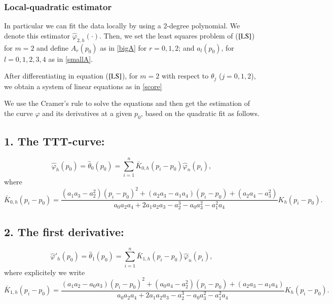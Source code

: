 \documentclass[preprint,12pt]{elsarticle}
\begin{document}
\subsubsection{Local-quadratic estimator}\label{quad}
\noindent In particular we can fit the data locally by using a 2-degree polynomial. We denote this estimator $\widehat{\varphi}_{2,h}(\cdot)$. Then, we set the least squares problem of ($\ref{LS}$) for $m=2$ and define $A_r(p_0)$ as in \eqref{bigA} for $ r=0,1,2$; and  $
a_l(p_0)$, for $ l=0, 1, 2, 3, 4$ as in \eqref{smallA}.

After differentiating in equation ($\ref{LS}$), for $m=2$ with respect to $\theta_j$ ($j=0, 1, 2$), we obtain a system of linear equations as in \eqref{score}


We use the Cramer's rule to solve the equations and then get the estimation of the curve $\varphi$ and its derivatives at a given $p_0$, based on the quadratic fit as follows.
\subsection*{ 1. The TTT-curve:}
\begin{equation}\label{theta0}
\widehat{\varphi}_{h}(p_0)=\widehat{\theta}_0(p_0)= \sum_{i=1}^n \bar{{K}}_{0,h}\left(p_i-p_0\right) \widehat{\varphi}_n(p_i),
\end{equation}
where
\[
\bar{{K}}_{0,h}\left(p_i-p_0\right)=\frac{\left(a_1a_3-a_2^2\right)\left(p_i-p_0\right)^2+\left(a_2a_3-a_1a_4\right)\left(p_i-p_0\right)+\left(a_2a_4-a_3^2\right)}{a_0a_2a_4+2a_1a_2a_3-a_2^3-a_0a_3^2-a_1^2a_4} K_h\left(p_i-p_0\right).
\]

\subsection*{2. The first derivative:}
\begin{equation}\label{theta1}
\widehat{\varphi}'_{h}(p_0)=\widehat{\theta}_1(p_0)= \sum_{i=1}^n \bar{{K}}_{1,h}\left(p_i-p_0\right) \widehat{\varphi}_n(p_i),
\end{equation}
where explicitely we write
\[
\bar{{K}}_{1,h}\left(p_i-p_0\right)=\frac{\left(a_1a_2-a_0a_3\right)\left(p_i-p_0\right)^2+\left(a_0a_4-a_2^2\right)\left(p_i-p_0\right)+\left(a_2a_3-a_1a_4\right)}{a_0a_2a_4+2a_1a_2a_3-a_2^3-a_0a_3^2-a_1^2a_4} K_h\left(p_i-p_0\right).
\]
\end{document}
